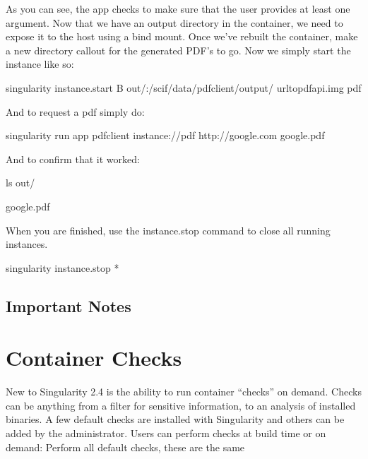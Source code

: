 \documentclass[letterpaper,10pt,english]{sphinxmanual}
\begin{document}
As you can see, the  app checks to make sure that the user provides at
least one argument. Now that we have an output directory in the
container, we need to expose it to the host using a bind mount. Once
we’ve rebuilt the container, make a new directory callout  for the
generated PDF’s to go. Now we simply start the instance like so:

%
\begin{sphinxVerbatim}[commandchars=\\\{\}]
\PYGZdl{} singularity instance.start \PYGZhy{}B out/:/scif/data/pdf\PYGZus{}client/output/ url\PYGZhy{}to\PYGZhy{}pdf\PYGZhy{}api.img pdf
\end{sphinxVerbatim}

And to request a pdf simply do:

%
\begin{sphinxVerbatim}[commandchars=\\\{\}]
\PYGZdl{} singularity run \PYGZhy{}\PYGZhy{}app pdf\PYGZus{}client instance://pdf http://google.com google.pdf
\end{sphinxVerbatim}

And to confirm that it worked:

%
\begin{sphinxVerbatim}[commandchars=\\\{\}]
\PYGZdl{} ls out/

google.pdf
\end{sphinxVerbatim}

When you are finished, use the instance.stop command to close all
running instances.

%
\begin{sphinxVerbatim}[commandchars=\\\{\}]
\PYGZdl{} singularity instance.stop \PYGZbs{}*
\end{sphinxVerbatim}


\section{Important Notes}
\label{\detokenize{running_services:important-notes}}

\chapter{Container Checks}
\label{\detokenize{container_checks:container-checks}}\label{\detokenize{container_checks::doc}}
New to Singularity 2.4 is the ability to run container “checks” on
demand. Checks can be anything from a filter for sensitive
information, to an analysis of installed binaries. A few default
checks are installed with Singularity and others can be added by the
administrator. Users can perform checks at build time or on demand:
Perform all default checks, these are the same
\end{document}
